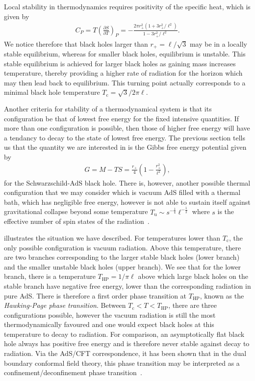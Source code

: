 \documentclass[
twoside,
openright,
frontopenright,
]{dmathesis}
\begin{document}
Local stability in thermodynamics requires positivity of the specific heat,
which is given by
\begin{align}
  C_P = T \left(\frac{\partial S}{\partial T}\right)_P =
  -\frac{2\pi r_+^2(1+3r_+^2/\ell^2)}{1-3r_+^2/\ell^2} .
\end{align}
We notice therefore that black holes larger than $r_+ = \ell/\sqrt{3}$ may be in
a locally stable equilibrium, whereas for smaller black holes, equilibrium is
unstable. This stable equilibrium is achieved for larger black holes as gaining
mass increases temperature, thereby providing a higher rate of radiation for the
horizon which may then lead back to equilibrium. This turning point actually
corresponds to a minimal black hole temperature
$T_\mathrm{c} = \sqrt{3}/2\pi\ell$.

Another criteria for stability of a thermodynamical system is that its
configuration be that of lowest free energy for the fixed intensive
quantities. If more than one configuration is possible, then those of higher
free energy will have a tendancy to decay to the state of lowest free
energy. The previous section tells us that the quantity we are interested in is
the Gibbs free energy potential given by
\begin{align}
  G = M - TS = \frac{r_+}{4}\left(1-\frac{r_+^2}{\ell^2}\right),
\end{align}
for the Schwarzschild-AdS black hole. There is, however, another possible
thermal configuration that we may consider which is vacuum AdS filled with a
thermal bath, which has negligible free energy, however is not able to sustain
itself against gravitational collapse beyond some temperature $T_\mathrm{u} \sim
s^{-\frac14} \ell^{-\frac12}$ where $s$ is the effective number of spin states
of the radiation~\cite{Hawking:1982dh}. 

 illustrates the situation we have described. For
temperatures lower than $T_\mathrm{c}$, the only possible configuration is
vacuum radiation. Above this temperature, there are two branches corresponding
to the larger stable black holes (lower branch) and the smaller unstable black
holes (upper branch). We see that for the lower branch, there is a temperature
$T_\mathrm{HP} = 1/\pi\ell$ above which large black holes on the stable branch
have negative free energy, lower than the corresponding radiation in pure
AdS. There is therefore a first order phase transition at $T_\mathrm{HP}$, known
as the \emph{Hawking-Page phase transition}. Between
$T_\mathrm{c}<T<T_\mathrm{HP}$, there are three configurations possible, however
the vacuum radiation is still the most thermodynamically favoured and one would
expect black holes at this temperature to decay to radiation. For comparison, an
asymptotically flat black hole always has positive free energy and is therefore
never stable against decay to radiation. Via the AdS/CFT correspondence, it has
been shown that in the dual boundary conformal field theory, this phase
transition may be interpreted as a confinement/deconfinement phase
transition~\cite{Witten:1998zw}.
\end{document}
